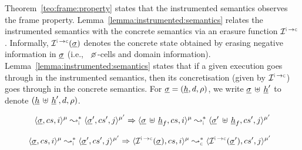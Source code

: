 


Theorem~\ref{teo:frame:property} states that the \jsil instrumented semantics observes the 
frame property. Lemma~\ref{lemma:instrumented:semantics} relates the instrumented 
semantics with the concrete semantics via an erasure function  $\interpret{\instconc}{}$. Informally, $\interpret{\instconc}{}(\istate)$
denotes the concrete state obtained by erasing negative information in $\underline{\sigma}$ (i.e.,~  
$\none$-cells and domain information). 
Lemma~\ref{lemma:instrumented:semantics} states that if a given execution 
goes through in the instrumented semantics, then its concretisation (given by $\interpret{\instconc}{}$) 
goes through in the concrete semantics. %
For $\underline{\sigma} = (\underline{h}, d, \rho)$, we write $\underline{\sigma} \, \uplus \, \underline{h}'$ to denote $(\underline{h} \, \uplus \, \underline{h}', d, \rho)$.

\begin{theorem}\label{teo:frame:property}
\hspace*{-0.28cm}$$
\transabssemrule{\istate, \cs, i}{\istate', \cs', j}{\mode}{\mode'}{\instrumented}\Rightarrow
        \transabssemrule{\istate \dunion \iheap_f, \cs, i}{\istate' \dunion \iheap_f, \cs', j}{\mode}{\mode'}{\instrumented} 
$$
\end{theorem}

\begin{lemma}\label{lemma:instrumented:semantics}
$$
\hspace*{-0.22cm}
\transabssemrule{\istate, \cs, i}{\istate', \cs', j}{\mode}{\mode'}{\instrumented} \Rightarrow \transabssemrule{\interpret{\instconc}{}(\istate), \cs, i}{\interpret{\instconc}{}(\istate'), \cs', j}{\mode}{\mode'}{\concrete} 
$$
\end{lemma}



